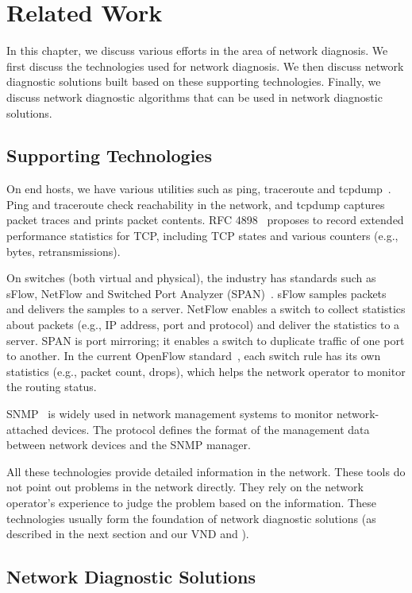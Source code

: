\chapter{Related Work}
\label{chap:related}
In this chapter, we discuss various efforts in the area of network diagnosis.
We first discuss the technologies used for network diagnosis. We
then discuss network diagnostic solutions built based 
on these supporting technologies. Finally, we discuss network diagnostic
algorithms that can be used in network diagnostic solutions.


\section{Supporting Technologies}
On end hosts, we have various utilities such as ping,
traceroute and tcpdump~\cite{traceroute, tcpdump}. Ping and traceroute
check reachability in the network, and tcpdump captures
packet traces and prints packet contents.
RFC 4898~\cite{rfc4898} proposes to record extended performance statistics
for TCP, including TCP states and various counters (e.g., bytes, retransmissions).

On switches (both virtual and physical), the industry has standards such as
sFlow, NetFlow and Switched Port Analyzer (SPAN)~\cite{sflow, netflow, span}. 
sFlow samples packets and 
delivers the samples to a server. NetFlow enables a switch to collect statistics
about packets (e.g., IP address, port and protocol) and deliver the statistics to 
a server. SPAN is port mirroring; it enables a switch to duplicate traffic
of one port to another. In the current OpenFlow standard~\cite{openflow}, each switch rule has
its own statistics (e.g., packet count, drops), which helps the network operator
to monitor the routing status.

SNMP~\cite{snmp} is widely used in network management systems to monitor network-attached devices.
The protocol defines the format of the management data between network devices
and the SNMP manager. 

All these technologies provide detailed information in the network. These tools
do not point out problems in the network directly. They rely on the network
operator's experience to judge the problem based on the information.
These technologies usually form the foundation of network diagnostic solutions
(as described in the next section and our VND and \Name).
\section{Network Diagnostic Solutions}
